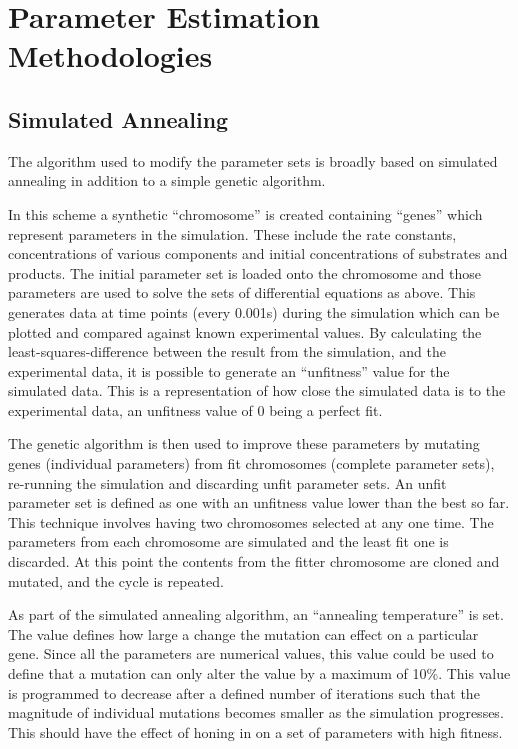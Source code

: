 \chapter{Parameter Estimation Methodologies}
\section{Simulated Annealing}

The algorithm used to modify the parameter sets is broadly based on simulated annealing in addition to a simple genetic algorithm.
 
In this scheme a synthetic ``chromosome'' is created containing ``genes'' which represent parameters in the simulation. These include the rate constants, concentrations of various components and initial concentrations of substrates and products. The initial parameter set is loaded onto the chromosome and those parameters are used to solve the sets of differential equations as above. This generates data at time points (every 0.001s) during the simulation which can be plotted and compared against known experimental values. By calculating the least-squares-difference between the result from the simulation, and the experimental data, it is possible to generate an ``unfitness'' value for the simulated data. This is a representation of how close the simulated data is to the experimental data, an unfitness value of 0 being a perfect fit. 

The genetic algorithm is then used to improve these parameters by mutating genes (individual parameters) from fit chromosomes (complete parameter sets), re-running the simulation and discarding unfit parameter sets. An unfit parameter set is defined as one with an unfitness value lower than the best so far. This technique involves having two chromosomes selected at any one time. The parameters from each chromosome are simulated and the least fit one is discarded. At this point the contents from the fitter chromosome are cloned and mutated, and the cycle is repeated.

As part of the simulated annealing algorithm, an ``annealing temperature'' is set. The value defines how large a change the mutation can effect on a particular gene. Since all the parameters are numerical values, this value could be used to define that a mutation can only alter the value by a maximum of 10\%. This value is programmed to decrease after a defined number of iterations such that the magnitude of individual mutations becomes smaller as the simulation progresses. This should have the effect of honing in on a set of parameters with high fitness.

